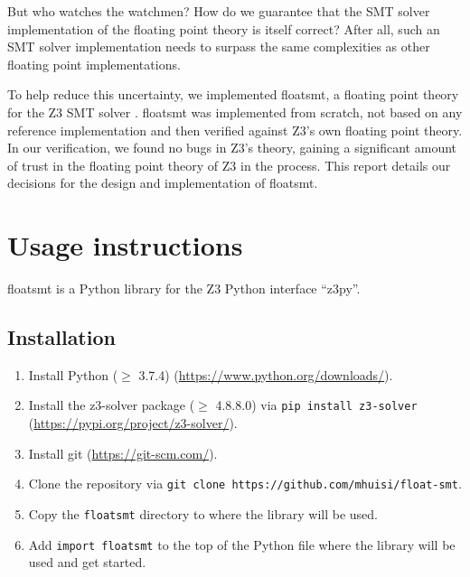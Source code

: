 \documentclass[a4paper,UKenglish,cleveref, autoref, thm-restate]{lipics-v2019}
\begin{document}
But who watches the watchmen? How do we guarantee that the SMT solver implementation of the floating point theory is itself correct? After all, such an SMT solver implementation needs to surpass the same complexities as other floating point implementations.

To help reduce this uncertainty, we implemented floatsmt, a floating point theory for the Z3 SMT solver \cite{z3}. floatsmt was implemented from scratch, not based on any reference implementation and then verified against Z3's own floating point theory. In our verification, we found no bugs in Z3's theory, gaining a significant amount of trust in the floating point theory of Z3 in the process. This report details our decisions for the design and implementation of floatsmt.

\section{Usage instructions}
floatsmt is a Python library for the Z3 Python interface ``z3py''.

\subsection{Installation}
\begin{enumerate}
\item Install Python ($\geq$ 3.7.4) (\url{https://www.python.org/downloads/}).
\item Install the z3-solver package ($\geq$ 4.8.8.0) via \verb|pip install z3-solver| (\url{https://pypi.org/project/z3-solver/}).
\item Install git (\url{https://git-scm.com/}).
\item Clone the repository via \verb|git clone https://github.com/mhuisi/float-smt|.
\item Copy the \verb|floatsmt| directory to where the library will be used.
\item Add \verb|import floatsmt| to the top of the Python file where the library will be used and get started.
\end{enumerate} 
\end{document}
